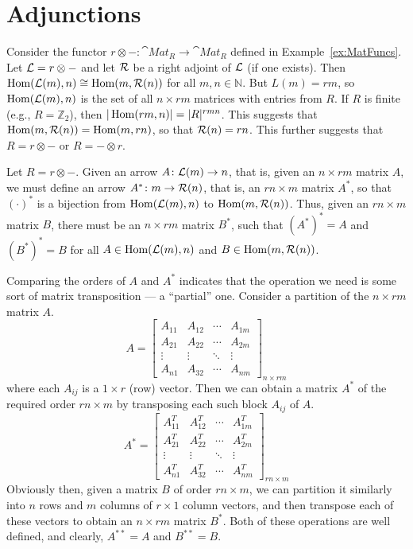 \chapter{Adjunctions}\label{chap:Adjunctions}
\begin{Example}\label{ex:MatAdj}
Consider the functor $r \otimes - \colon \cat{Mat}_R \to \cat{Mat}_R$ defined in Example~\ref{ex:MatFuncs}. Let $\mathcal{L} = r \otimes -$ and let $\mathcal{R}$ be a right adjoint of $\mathcal{L}$ (if one exists). Then $\operatorname{Hom}(\mathcal{L}(m), n) \cong \operatorname{Hom}(m, \mathcal{R}(n))$ for all $m, n \in \mathbb N$. But $L(m) = rm$, so $\operatorname{Hom}(\mathcal{L}(m), n)$ is the set of all $n \times rm$ matrices with entries from $R$. If $R$ is finite (e.g., $R = \mathbb Z_2$), then $|\operatorname{Hom}(rm, n)| = |R|^{rmn}$. This suggests that $\operatorname{Hom}(m, \mathcal{R} (n)) = \operatorname{Hom}(m, rn)$, so that $\mathcal{R}(n) = rn$. This further suggests that $R = r \otimes -$ or $R = - \otimes r$.

Let $R = r \otimes -$. Given an arrow $A \colon \mathcal{L}(m) \to n$, that is, given an $n \times rm$ matrix $A$, we must define an arrow $A^* \colon m \to \mathcal{R}(n)$, that is, an $rn \times m$ matrix $A^*$, so that $(\cdot)^*$ is a bijection from $\operatorname{Hom}(\mathcal{L}(m), n)$ to $\operatorname{Hom}(m, \mathcal{R}(n))$. Thus, given an $rn \times m$ matrix $B$, there must be an $n \times rm$ matrix $B^*$, such that $(A^*)^* = A$ and $(B^*)^* = B$ for all $A \in \operatorname{Hom}(\mathcal{L}(m), n)$ and $B \in \operatorname{Hom}(m, \mathcal{R}(n))$.

Comparing the orders of $A$ and $A^*$ indicates that the operation we need is some sort of matrix transposition --- a ``partial'' one. Consider a partition of the $n \times rm$ matrix $A$.
\begin{equation*}
A = \begin{bmatrix}
A_{11}	&	A_{12}	&	\cdots	&	A_{1m}	\\
A_{21}	&	A_{22}	&	\cdots	&	A_{2m}	\\
\vdots	&	\vdots	&	\ddots	&	\vdots	\\
A_{n1}	&	A_{32}	&	\cdots	&	A_{nm}
\end{bmatrix}_{n \times rm}
\end{equation*}
where each $A_{ij}$ is a $1 \times r$ (row) vector. Then we can obtain a matrix $A^*$ of the required order $rn \times m$ by transposing each such block $A_{ij}$ of $A$.
\begin{equation*}
A^* = \begin{bmatrix}
A^T_{11}	&	A^T_{12}	&	\cdots	&	A^T_{1m}	\\
A^T_{21}	&	A^T_{22}	&	\cdots	&	A^T_{2m}	\\
\vdots	&	\vdots	&	\ddots	&	\vdots	\\
A^T_{n1}	&	A^T_{32}	&	\cdots	&	A^T_{nm}
\end{bmatrix}_{rn \times m}
\end{equation*}
Obviously then, given a matrix $B$ of order $rn \times m$, we can partition it similarly into $n$ rows and $m$ columns of $r \times 1$ column vectors, and then transpose each of these vectors to obtain an $n \times rm$ matrix $B^*$. Both of these operations are well defined, and clearly, $A^{**} = A$ and $B^{**} = B$.


\end{Example}
